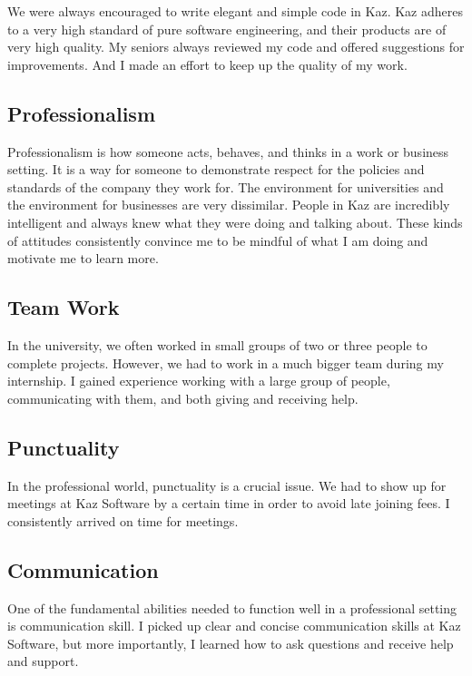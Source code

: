 We were always encouraged to write elegant and simple code in Kaz.
Kaz adheres to a very high standard of pure software engineering, and their products are of very high quality.
My seniors always reviewed my code and offered suggestions for improvements.
And I made an effort to keep up the quality of my work.

\subsection{Professionalism}

Professionalism is how someone acts, behaves, and thinks in a work or business setting.
It is a way for someone to demonstrate respect for the policies and standards of the company they work for.
The environment for universities and the environment for businesses are very dissimilar.
People in Kaz are incredibly intelligent and always knew what they were doing and talking about.
These kinds of attitudes consistently convince me to be mindful of what I am doing and motivate me to learn more.

\subsection{Team Work}

In the university, we often worked in small groups of two or three people to complete projects.
However, we had to work in a much bigger team during my internship.
I gained experience working with a large group of people, communicating with them, and both giving and receiving help.

\subsection{Punctuality}

In the professional world, punctuality is a crucial issue.
We had to show up for meetings at Kaz Software by a certain time in order to avoid late joining fees.
I consistently arrived on time for meetings.

\subsection{Communication}

One of the fundamental abilities needed to function well in a professional setting is communication skill.
I picked up clear and concise communication skills at Kaz Software, but more importantly, I learned how to ask questions and receive help and support.

